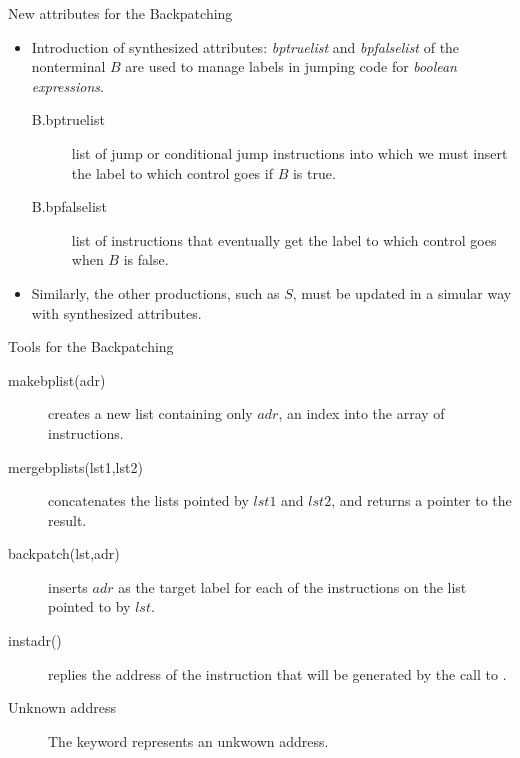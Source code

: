 \begin{bibunit}[apalike]
\begin{frame}{New attributes for the Backpatching}
	\begin{itemize}
	\item Introduction of synthesized attributes: \emph{bptruelist} and \emph{bpfalselist} of the nonterminal $B$ are used to manage labels in jumping code for \emph{boolean expressions}.
	\vfill
		\begin{description}
		\item[B.bptruelist] list of jump or conditional jump instructions into which we must insert the label to which control goes if $B$ is true.
	\vfill
		\item[B.bpfalselist] list of instructions that eventually get the label to which control goes when $B$ is false.
		\end{description}
	\vfill
	\item Similarly, the other productions, such as $S$, must be updated in a simular way with synthesized attributes.
	\end{itemize}
\end{frame}

\begin{frame}{Tools for the Backpatching}
	\begin{description}
	\item[makebplist(adr)] creates a new list containing only $adr$, an index into the array of instructions.
	\vfill
	\item[mergebplists(lst1,lst2)] concatenates the lists pointed by $lst1$ and $lst2$, and returns a pointer to the result.
	\vfill
	\item[backpatch(lst,adr)] inserts $adr$ as the target label for each of the instructions on the list pointed to by $lst$.
	\vfill
	\item[instadr()] replies the address of the instruction that will be generated by the  call to .
	\vfill
	\item[Unknown address] The keyword  represents an unkwown address.
	\end{description}
\end{frame}


\end{bibunit}
